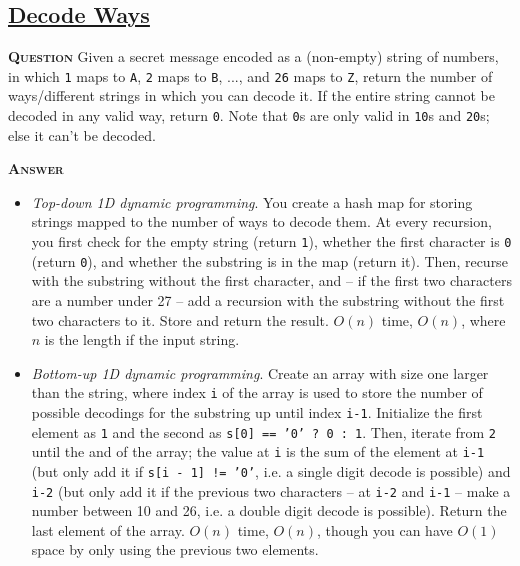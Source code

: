 \documentclass[table, xcdraw]{article}%
\begin{document}
\subsection{\href{https://leetcode.com/problems/decode-ways}{Decode Ways}}

\textsc{\textbf{Question}} Given a secret message encoded as a (non-empty) string of numbers, in which \texttt{1} maps to \texttt{A}, \texttt{2} maps to \texttt{B}, ..., and \texttt{26} maps to \texttt{Z}, return the number of ways/different strings in which you can decode it. If the entire string cannot be decoded in any valid way, return \texttt{0}. Note that \texttt{0}s are only valid in \texttt{10}s and \texttt{20}s; else it can't be decoded.

\textsc{\textbf{Answer}}

\begin{itemize}
    \item \textit{Top-down 1D dynamic programming}. You create a hash map for storing strings mapped to the number of ways to decode them. At every recursion, you first check for the empty string (return \texttt{1}), whether the first character is \texttt{0} (return \texttt{0}), and whether the substring is in the map (return it). Then, recurse with the substring without the first character, and -- if the first two characters are a number under 27 -- add a recursion with the substring without the first two characters to it. Store and return the result. $O(n)$ time, $O(n)$, where $n$ is the length if the input string.
    \item \textit{Bottom-up 1D dynamic programming}. Create an array with size one larger than the string, where index \texttt{i} of the array is used to store the number of possible decodings for the substring up until index \texttt{i-1}. Initialize the first element as \texttt{1} and the second as \texttt{s[0] == '0' ? 0 : 1}. Then, iterate from \texttt{2} until the and of the array; the value at \texttt{i} is the sum of the element at \texttt{i-1} (but only add it if \texttt{s[i - 1] != '0'}, i.e. a single digit decode is possible) and \texttt{i-2} (but only add it if the previous two characters -- at \texttt{i-2} and \texttt{i-1} -- make a number between 10 and 26, i.e. a double digit decode is possible). Return the last element of the array. $O(n)$ time, $O(n)$, though you can have $O(1)$ space by only using the previous two elements.
\end{itemize}
\end{document}
